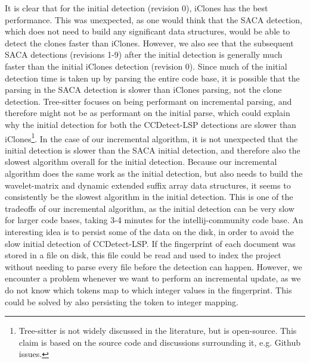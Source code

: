 It is clear that for the initial detection (revision 0), iClones has the best performance.
This was unexpected, as one would think that the SACA detection, which does not need to
build any significant data structures, would be able to detect the clones faster than
iClones. However, we also see that the subsequent SACA detections (revisions 1-9) after
the initial detection is generally much faster than the initial iClones detection
(revision 0). Since much of the initial detection time is taken up by parsing the entire
code base, it is possible that the parsing in the SACA detection is slower than iClones
parsing, not the clone detection. Tree-sitter focuses on being performant on incremental
parsing, and therefore might not be as performant on the initial parse, which could
explain why the initial detection for both the CCDetect-LSP detections are slower than
iClones\footnote{Tree-sitter is not widely discussed in the literature, but is
open-source. This claim is based on the source code and discussions surrounding it, e.g.
Github issues.}. In the case of our incremental algorithm, it is not unexpected that the
initial detection is slower than the SACA initial detection, and therefore also the
slowest algorithm overall for the initial detection. Because our incremental algorithm
does the same work as the initial detection, but also needs to build the wavelet-matrix
and dynamic extended suffix array data structures, it seems to consistently be the slowest
algorithm in the initial detection. This is one of the tradeoffs of our incremental
algorithm, as the initial detection can be very slow for larger code bases, taking 3-4
minutes for the intellij-community code base. An interesting idea is to persist some of
the data on the disk, in order to avoid the slow initial detection of CCDetect-LSP. If the
fingerprint of each document was stored in a file on disk, this file could be read and
used to index the project without needing to parse every file before the detection can
happen. However, we encounter a problem whenever we want to perform an incremental update,
as we do not know which tokens map to which integer values in the fingerprint. This could
be solved by also persisting the token to integer mapping.

